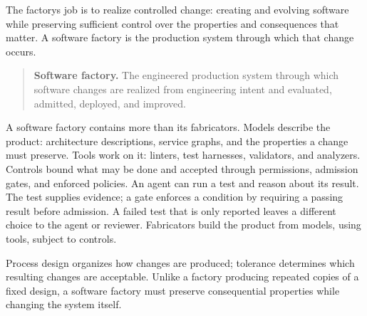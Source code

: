 
The factory\textquotesingle s job is to realize controlled change: creating and evolving software while preserving sufficient control over the properties and consequences that matter\citep{davis2026sehandbook}. A software factory is the production system through which that change occurs.

\begin{quote}
\textbf{Software factory.} The engineered production system through which software changes are realized from engineering intent and evaluated, admitted, deployed, and improved.
\end{quote}


A software factory contains more than its fabricators. Models describe the product: architecture descriptions, service graphs, and the properties a change must preserve. Tools work on it: linters, test harnesses, validators, and analyzers. Controls bound what may be done and accepted through permissions, admission gates, and enforced policies. An agent can run a test and reason about its result. The test supplies evidence; a gate enforces a condition by requiring a passing result before admission. A failed test that is only reported leaves a different choice to the agent or reviewer. Fabricators build the product from models, using tools, subject to controls.


Process design organizes how changes are produced; tolerance determines which resulting changes are acceptable. Unlike a factory producing repeated copies of a fixed design, a software factory must preserve consequential properties while changing the system itself.

